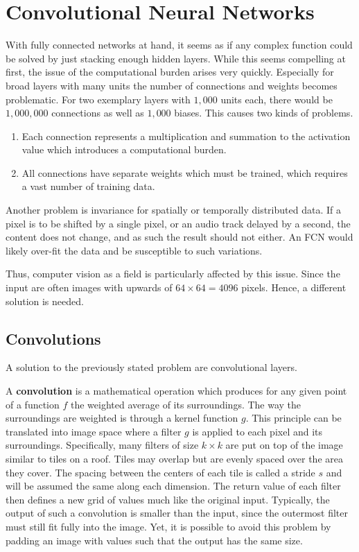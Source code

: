 \section[Convolutional NNs]{Convolutional Neural Networks}
With fully connected networks at hand, it seems as if any complex function could be solved by just stacking enough hidden layers.
While this seems compelling at first, the issue of the computational burden arises very quickly.
Especially for broad layers with many units the number of connections and weights becomes problematic.
For two exemplary layers with $1,000$ units each, there would be $1,000,000$ connections as well as $1,000$ biases.
This causes two kinds of problems.
\begin{enumerate}
    \item Each connection represents a multiplication and summation to the activation value which introduces a computational burden.
    \item All connections have separate weights which must be trained, which requires a vast number of training data.
\end{enumerate}

Another problem is invariance for spatially or temporally distributed data.
If a pixel is to be shifted by a single pixel, or an audio track delayed by a second, the content does not change, and as such the result should not either.
An FCN would likely over-fit the data and be susceptible to such variations.

Thus, computer vision as a field is particularly affected by this issue.
Since the input are often images with upwards of $64 \times 64 = 4096$ pixels.
Hence, a different solution is needed.

\subsection{Convolutions}
A solution to the previously stated problem are convolutional layers.

A \textbf{convolution} is a mathematical operation which produces for any given point of a function $f$ the weighted average of its surroundings.
The way the surroundings are weighted is through a kernel function $g$.
This principle can be translated into image space where a filter $g$ is applied to each pixel and its surroundings.
Specifically, many filters of size $k \times k$ are put on top of the image similar to tiles on a roof.
Tiles may overlap but are evenly spaced over the area they cover.
The spacing between the centers of each tile is called a stride $s$ and will be assumed the same along each dimension.
The return value of each filter then defines a new grid of values much like the original input.
Typically, the output of such a convolution is smaller than the input, since the outermost filter must still fit fully into the image.
Yet, it is possible to avoid this problem by padding an image with values such that the output has the same size.

